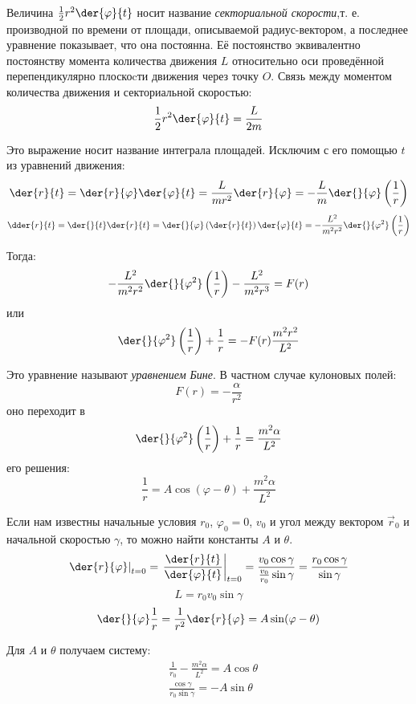 Величина \( \frac{1}{2}r^2 \der{\varphi}{t} \) носит название
\textit{секториальной скорости},т. е. производной по времени от площади,
описываемой радиус-вектором, а последнее уравнение показывает, что она
постоянна. Её постоянство эквивалентно постоянству момента количества движения
\( L \) относительно оси проведённой перепендикулярно плоскоcти движения через
точку \( O \). Связь между моментом количества движения и секториальной
скоростью:
\[
    \frac{1}{2}r^2 \der{\varphi}{t} = \frac{L}{2m}
\]   

Это выражение носит название интеграла площадей. Исключим с его помощью \( t \)
из уравнений движения:
\[
    \der{r}{t} = 
    \der{r}{\varphi} \der{\varphi}{t} =
    \frac{L}{mr^2 } \der{r}{\varphi} =
    -\frac{L}{m} \der{}{\varphi}\left( \frac{1}{r} \right)
\]   
\[
    \dder{r}{t} = 
    \der{}{t}\der{r}{t}  =
    \der{}{\varphi}\left(\der{r}{t}\right)\der{\varphi}{t} =
    -\frac{L^2}{m^2 r^2 } \der{}{\varphi^2}\left( \frac{1}{r} \right)
\]     
    
Тогда:
\[
    -\frac{L^2}{m^2 r^2 } \der{}{\varphi^2}\left( \frac{1}{r} \right) -
    \frac{L^2}{m^2 r^3} = 
    F(r)
\]   
или
\[
    \der{}{\varphi^2}\left( \frac{1}{r} \right) +
    \frac{1}{r} = 
    - F(r)\frac{m^2 r^2}{ L^2}
\]   

Это уравнение называют \textit{уравнением Бине}. В частном случае кулоновых
полей:
\[
    F(r) = -\frac{\alpha}{r^2}
\]   
оно переходит в
\[
    \der{}{\varphi^2}\left( \frac{1}{r} \right) +
        \frac{1}{r} = 
        \frac{m^2 \alpha}{ L^2}
\]     
его решения:
\[
    \frac{1}{r} = A \cos (\varphi - \theta) + \frac{m^2 \alpha}{ L^2}
\]   
    
Если нам известны начальные условия \( r_0 \), \( \varphi_0 = 0 \), \( v_0 \)
и угол между вектором \( \vec{r}_{0} \) и начальной скоростью \( \gamma \), то
можно найти константы \( A \) и \( \theta \).
\[
    \left.\der{r}{\varphi}\right|_{t=0} = 
    \left.\frac{\der{r}{t}}{\der{\varphi}{t}}\right|_{t=0} =
    \frac{ v_0 \cos \gamma}{\frac{v_0}{r_0}  \sin \gamma} =
    \frac{ r_0 \cos \gamma}{ \sin \gamma}
\]
\[   
    L = r_0 v_0 \sin \gamma
\]
\[   
    \der{}{\varphi}\frac{1}{r} = \frac{1}{r^2} \der{r}{\varphi} =
    A \sin (\varphi - \theta)
\]
    
Для \( A \) и \( \theta \) получаем систему:
\[
    \begin{split}
        &\frac{1}{r_0} -  \frac{m^2 \alpha}{ L^2} = A\cos\theta \\
        &\frac{ \cos\gamma}{ r_0 \sin\gamma} = - A\sin\theta
    \end{split}
\]
    
